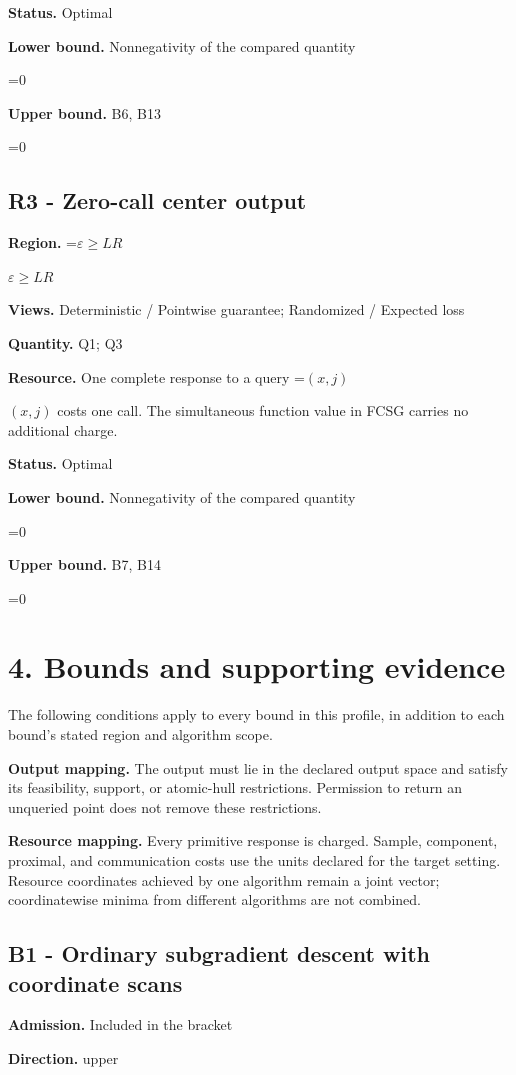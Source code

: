\documentclass[10pt,a4paper]{article}
\newcommand{\AtlasMath}[1]{\par\begingroup\centering\setbox0=\hbox{$\displaystyle #1$}\ifdim\wd0>1.4\linewidth\typeout{ATLAS WIDE FORMULA: \the\wd0}\fi\ifdim\wd0>\linewidth\resizebox{\linewidth}{!}{\box0}\else\box0\fi\par\endgroup}
\newcommand{\AtlasInlineMath}[1]{\begingroup\setbox0=\hbox{$#1$}\ifdim\wd0>.4\linewidth\endgroup\AtlasMath{#1}\else\endgroup$#1$\fi}
\begin{document}
\textbf{Status.} Optimal

\textbf{Lower bound.} Nonnegativity of the compared quantity

\AtlasMath{0}
\textbf{Upper bound.} B6, B13

\AtlasMath{0}
\subsection{R3 - Zero-call center output}
\textbf{Region.} \AtlasInlineMath{\varepsilon\ge LR}

\textbf{Views.} Deterministic / Pointwise guarantee; Randomized / Expected loss

\textbf{Quantity.} Q1; Q3

\textbf{Resource.} One complete response to a query \AtlasInlineMath{(x,j)} costs one call. The simultaneous function value in FCSG carries no additional charge.

\textbf{Status.} Optimal

\textbf{Lower bound.} Nonnegativity of the compared quantity

\AtlasMath{0}
\textbf{Upper bound.} B7, B14

\AtlasMath{0}
\section{4. Bounds and supporting evidence}
The following conditions apply to every bound in this profile, in addition to each bound's stated region and algorithm scope.

\textbf{Output mapping.} The output must lie in the declared output space and satisfy its feasibility, support, or atomic-hull restrictions. Permission to return an unqueried point does not remove these restrictions.

\textbf{Resource mapping.} Every primitive response is charged. Sample, component, proximal, and communication costs use the units declared for the target setting. Resource coordinates achieved by one algorithm remain a joint vector; coordinatewise minima from different algorithms are not combined.

\subsection{B1 - Ordinary subgradient descent with coordinate scans}
\textbf{Admission.} Included in the bracket

\textbf{Direction.} upper
\end{document}
